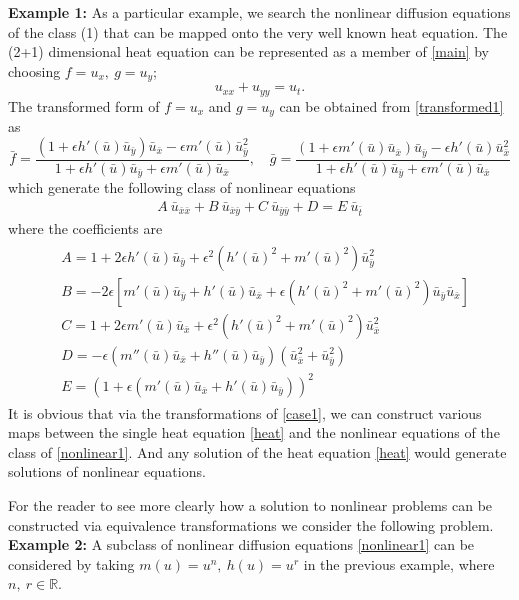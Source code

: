 \documentclass[a4paper]{article}
\def\bea{\begin{eqnarray}}
\def\eea{\end{eqnarray}}
\def\be{\begin{equation}}
\def\ee{\end{equation}}
\def\bes{\begin{equation*}}
\def\ees{\end{equation*}}
\begin{document}
 {\bf{Example 1:}} As a particular example, we search the nonlinear diffusion equations of the class (1) that can be mapped onto the very well known heat equation. The (2+1)  dimensional  heat equation can be represented as a member of \eqref{main} by choosing   $ f=u_x,\ g=u_y$;
   \be
\label{heat}
u_{xx}+u_{yy}= u_t.
\ee
The transformed form of $f=u_x$ and $g=u_y$ can be obtained  from \eqref{transformed1} as
 \bes
  \bar f=\frac{(1+\epsilon h'(\bar u)\bar u_{\bar y} )\bar u_{\bar x}-\epsilon m'(\bar u)\bar u_{\bar y}^2}{1+\epsilon h'(\bar u)\bar u_{\bar y} +\epsilon m'(\bar u)\bar u_{\bar x}},\quad
  \bar g=\frac{(1+\epsilon m'(\bar u)\bar u_{\bar x} )\bar u_{\bar y}-\epsilon h'(\bar u)\bar u_{\bar x}^2}{1+\epsilon h'(\bar u)\bar u_{\bar y} +\epsilon m'(\bar u)\bar u_{\bar x}}
 \ees
which generate the following class of nonlinear equations
 \bea
 \label{nonlinear1}
  A \ \bar u_{\bar x\bar x}+ B \ \bar u_{\bar x \bar y} +C \ \bar u_{\bar y\bar y} + D = E \ \bar u_{\bar t}
 \eea
 where the coefficients are 
 \bea
 \begin{split}
& A = 1+2 \epsilon h'(\bar u)\bar u_{\bar y}+\epsilon^2\left(h'(\bar u)^2+m'(\bar u)^2\right)\bar u_{\bar y}^2\\
& B = -2
 \epsilon \left[m'(\bar u)\bar u_{\bar y}+h'(\bar u)\bar u_{\bar x}+\epsilon\left(h'(\bar u)^2+m'(\bar u)^2\right)\bar u_{\bar y}\bar u_{\bar x}\right]
\\
& C= 1+2\epsilon  m'(\bar u)\bar u_{\bar x}
 + \epsilon^2\left(h'(\bar u)^2+m'(\bar u)^2\right)\bar u_{\bar x}^2 \\
& D =  -\epsilon
 \left(m''(\bar u)\bar u_{\bar x}+h''(\bar u)\bar u_{\bar y}\right) \left( \bar u_{\bar x}^2 + \bar u_{\bar y}^2\right) \\
  & E= \left(1+\epsilon(m'(\bar u)\bar u_{\bar x}+h'(\bar u)\bar u_{\bar y})\right)^2
 \end{split}
 \eea
It is obvious that via the  transformations of \eqref{case1}, we can construct  various  maps between   the single heat equation \eqref{heat} and the nonlinear  equations of  the class of  \eqref{nonlinear1}. And any solution of the heat equation \eqref{heat} would generate solutions of nonlinear equations. 
\par 
For the reader to see more clearly how a solution to  nonlinear problems can be constructed via  equivalence transformations we consider the following problem.\\
 {\bf Example 2:}
A subclass of nonlinear diffusion equations \eqref{nonlinear1} can be considered by taking  $m(u)=u^n,\ h(u)=u^r$ in the previous example, where $n,\ r \in \mathbb{R}$.  
\end{document}
